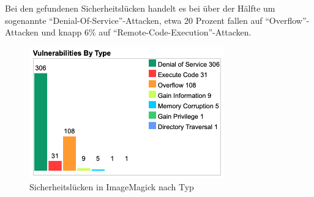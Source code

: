 Bei den gefundenen Sicherheitslücken handelt es bei über der Hälfte um sogenannte "`Denial-Of-Service"'-Attacken, etwa 20 Prozent fallen auf "`Overflow"'-Attacken und knapp 6\% auf "`Remote-Code-Execution"'-Attacken.

\begin{figure}[!hb]
    \includegraphics[width=0.75\textwidth]{img/CVEDetailsVulnsType.png}
    \caption{Sicherheitslücken in ImageMagick nach Typ}
\end{figure}
